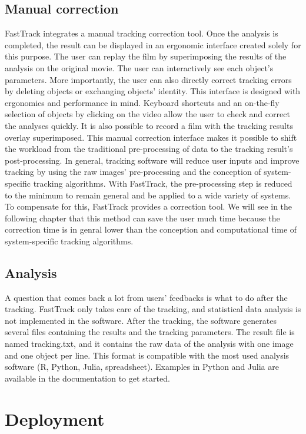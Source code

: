 		\subsection{Manual correction}
        FastTrack integrates a manual tracking correction tool. Once the analysis is completed, the result can be displayed in an ergonomic interface created solely for this purpose. The user can replay the film by superimposing the results of the analysis on the original movie. The user can interactively see each object's parameters. More importantly, the user can also directly correct tracking errors by deleting objects or exchanging objects' identity.
        This interface is designed with ergonomics and performance in mind. Keyboard shortcuts and an on-the-fly selection of objects by clicking on the video allow the user to check and correct the analyses quickly. It is also possible to record a film with the tracking results overlay superimposed.
        This manual correction interface makes it possible to shift the workload from the traditional pre-processing of data to the tracking result's post-processing. In general, tracking software will reduce user inputs and improve tracking by using the raw images' pre-processing and the conception of system-specific tracking algorithms. With FastTrack, the pre-processing step is reduced to the minimum to remain general and be applied to a wide variety of systems. To compensate for this, FastTrack provides a correction tool. We will see in the following chapter that this method can save the user much time because the correction time is in genral lower than the conception and computational time of system-specific tracking algorithms.

		\subsection{Analysis}
        A question that comes back a lot from users' feedbacks is what to do after the tracking. FastTrack only takes care of the tracking, and statistical data analysis is not implemented in the software. After the tracking, the software generates several files containing the results and the tracking parameters. The result file is named tracking.txt, and it contains the raw data of the analysis with one image and one object per line. This format is compatible with the most used analysis software (R, Python, Julia, spreadsheet). Examples in Python and Julia are available in the documentation to get started.

	\section{Deployment}
